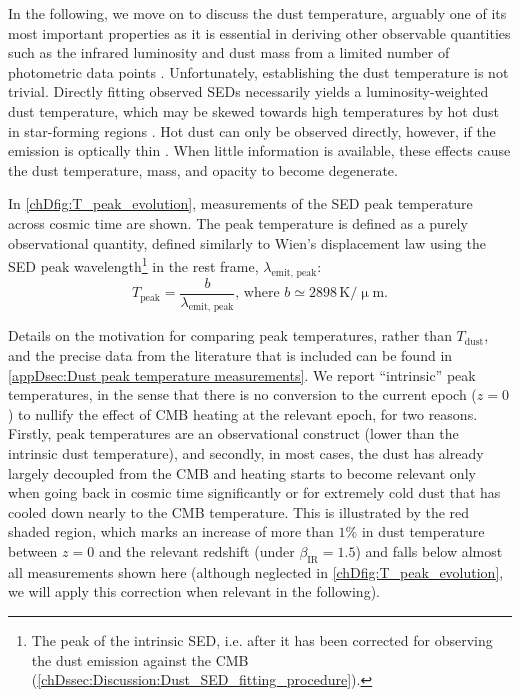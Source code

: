 In the following, we move on to discuss the dust temperature, arguably one of its most important properties as it is essential in deriving other observable quantities such as the infrared luminosity and dust mass from a limited number of photometric data points \citep{2020MNRAS.497..956S, 2022MNRAS.513.3122S}. Unfortunately, establishing the dust temperature is not trivial. Directly fitting observed SEDs necessarily yields a luminosity-weighted dust temperature, which may be skewed towards high temperatures by hot dust in star-forming regions \citep{2019MNRAS.489.1397L}. Hot dust can only be observed directly, however, if the emission is optically thin \citep{2020MNRAS.498.4192F}. When little information is available, these effects cause the dust temperature, mass, and opacity to become degenerate.

In \cref{chDfig:T_peak_evolution}, measurements of the SED peak temperature across cosmic time are shown. The peak temperature is defined as a purely observational quantity, defined similarly to Wien's displacement law using the SED peak wavelength\footnote{The peak of the intrinsic SED, i.e. after it has been corrected for observing the dust emission against the CMB (\cref{chDssec:Discussion:Dust_SED_fitting_procedure}).} in the rest frame, $\lambda_\text{emit, peak}$:
\begin{equation}
    \label{chDeq:T_peak}
    T_\text{peak} = \frac{b}{\lambda_\text{emit, peak}} \text{, where } b \simeq 2898 \, \mathrm{K / \upmu m}.
\end{equation}

Details on the motivation for comparing peak temperatures, rather than $T_\text{dust}$, and the precise data from the literature that is included can be found in \cref{appDsec:Dust peak temperature measurements}. We report ``intrinsic'' peak temperatures, in the sense that there is no conversion to the current epoch ($z=0$) to nullify the effect of CMB heating at the relevant epoch, for two reasons. Firstly, peak temperatures are an observational construct (lower than the intrinsic dust temperature), and secondly, in most cases, the dust has already largely decoupled from the CMB and heating \citep[described by equation (12) of][]{2013ApJ...766...13D} starts to become relevant only when going back in cosmic time significantly or for extremely cold dust that has cooled down nearly to the CMB temperature. This is illustrated by the red shaded region, which marks an increase of more than $1\%$ in dust temperature between $z=0$ and the relevant redshift (under $\beta_\text{IR} = 1.5$) and falls below almost all measurements shown here (although neglected in \cref{chDfig:T_peak_evolution}, we will apply this correction when relevant in the following).

